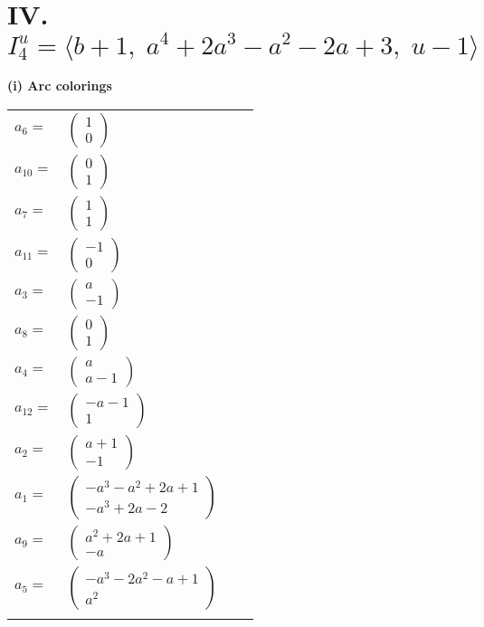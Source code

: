 \documentclass[1p]{elsarticle_modified}
\theoremstyle{definition}
\begin{document}
\centering \section*{IV. $I^u_{4}= \langle b+1,\;a^4+2 a^3- a^2-2 a+3,\;u-1 \rangle$}
\flushleft \textbf{(i) Arc colorings}\\
\begin{tabular}{m{7pt} m{180pt} m{7pt} m{180pt} }
\flushright $a_{6}=$&$\begin{pmatrix}1\\0\end{pmatrix}$ \\
\flushright $a_{10}=$&$\begin{pmatrix}0\\1\end{pmatrix}$ \\
\flushright $a_{7}=$&$\begin{pmatrix}1\\1\end{pmatrix}$ \\
\flushright $a_{11}=$&$\begin{pmatrix}-1\\0\end{pmatrix}$ \\
\flushright $a_{3}=$&$\begin{pmatrix}a\\-1\end{pmatrix}$ \\
\flushright $a_{8}=$&$\begin{pmatrix}0\\1\end{pmatrix}$ \\
\flushright $a_{4}=$&$\begin{pmatrix}a\\a-1\end{pmatrix}$ \\
\flushright $a_{12}=$&$\begin{pmatrix}- a-1\\1\end{pmatrix}$ \\
\flushright $a_{2}=$&$\begin{pmatrix}a+1\\-1\end{pmatrix}$ \\
\flushright $a_{1}=$&$\begin{pmatrix}- a^3- a^2+2 a+1\\- a^3+2 a-2\end{pmatrix}$ \\
\flushright $a_{9}=$&$\begin{pmatrix}a^2+2 a+1\\- a\end{pmatrix}$ \\
\flushright $a_{5}=$&$\begin{pmatrix}- a^3-2 a^2- a+1\\a^2\end{pmatrix}$\\&\end{tabular}
\end{document}

